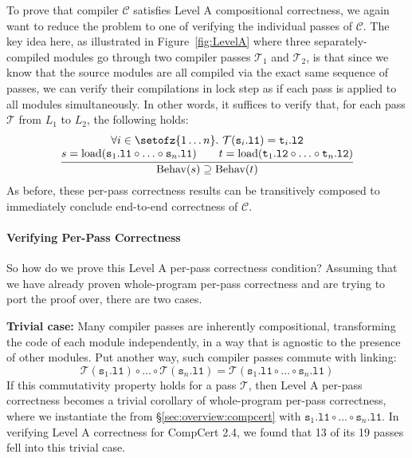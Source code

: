 To prove that compiler $\mathcal{C}$ satisfies Level A compositional correctness, we again want to
reduce the problem to one of verifying the individual passes of $\mathcal{C}$.  The key idea here,
as illustrated in Figure~\ref{fig:LevelA} where three separately-compiled modules go through two
compiler passes $\mathcal{T}_1$ and $\mathcal{T}_2$, is that since we know that the source modules
are all compiled via the exact same sequence of passes, we can verify their compilations in lock
step as if each pass is applied to all modules simultaneously.  In other words, it suffices to
verify that, for each pass $\mathcal{T}$ from $L_1$ to $L_2$, the following holds:
\[
\frac{
\begin{array}{@{}c@{}}
\forall i\in\setofz{1\ldots n}.~\mathcal{T}(\mathtt{s}_i\mathtt{.l1}) = \mathtt{t}_i\mathtt{.l2} \\
s = \mathrm{load}(\mathtt{s}_1\mathtt{.l1}\circ \ldots \circ \mathtt{s}_n\mathtt{.l1})\qquad
t = \mathrm{load}(\mathtt{t}_1\mathtt{.l2}\circ \ldots \circ \mathtt{t}_n\mathtt{.l2})
\end{array}
}
{
\mathrm{Behav}(s) 
\supseteq \mathrm{Behav}(t)
}
\]
As before, these per-pass correctness results can be transitively
composed to immediately conclude end-to-end correctness of
$\mathcal{C}$.

\paragraph{Verifying Per-Pass Correctness}
So how do we prove this Level A per-pass correctness condition?
Assuming that we have already proven whole-program per-pass correctness
and are trying to port the proof over, there are two cases.

\textbf{Trivial case:} Many compiler passes are inherently
compositional, transforming the code of each module independently, \ie
in a way that is agnostic to the presence of other modules.  Put
another way, such compiler passes commute with linking:
\[
\mathcal{T}(\mathtt{s}_1\mathtt{.l1})\circ \ldots \circ \mathcal{T}(\mathtt{s}_n\mathtt{.l1}) = \mathcal{T}(\mathtt{s}_1\mathtt{.l1}\circ \ldots \circ \mathtt{s}_n\mathtt{.l1})
\]
If this commutativity property holds for a pass $\mathcal{T}$, then
Level A per-pass correctness becomes a trivial corollary of
whole-program per-pass correctness, where we instantiate the 
from \S\ref{sec:overview:compcert} with $\mathtt{s}_1\mathtt{.l1}\circ
\ldots \circ \mathtt{s}_n\mathtt{.l1}$.  In verifying Level A
correctness for CompCert 2.4, we found that 13 of its 19 passes fell
into this trivial case.

